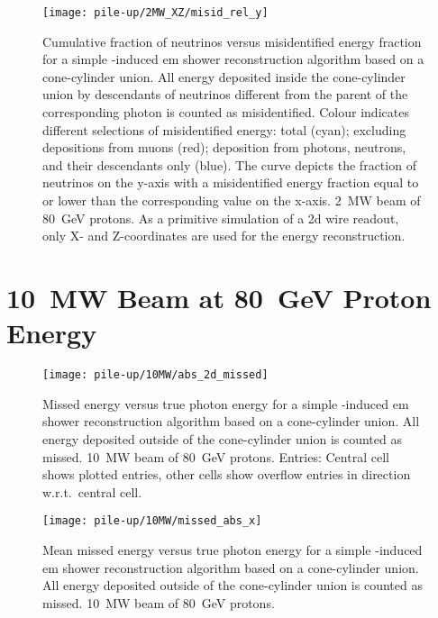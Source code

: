 \begin{figure}[tbp]
	\centering
	\texttt{[image: pile-up/2MW\_XZ/misid\_rel\_y]}
	\caption[Pile-up study neutrino vs.\ misidentified energy fraction, \SI{2}{\mega\watt} beam, XZ projection]{%
		Cumulative fraction of neutrinos versus misidentified energy fraction for a simple \Pgpz-induced \acrshort{em} shower reconstruction algorithm based on a cone-cylinder union.
		All energy deposited inside the cone-cylinder union by descendants of neutrinos different from the parent of the corresponding \Pgpz photon is counted as misidentified.
		Colour indicates different selections of misidentified energy: total (cyan); excluding depositions from muons (red); deposition from photons, neutrons, and their descendants only (blue).
		The curve depicts the fraction of neutrinos on the y-axis with a misidentified energy fraction equal to or lower than the corresponding value on the x-axis.
		\SI{2}{\mega\watt} beam of \SI{80}{\giga\electronvolt} protons.
		As a primitive simulation of a \acrshort{2d} wire readout, only X- and Z-coordinates are used for the energy reconstruction.
	}
\end{figure}


\clearpage
\section{\SI{10}{\mega\watt} Beam at \SI{80}{\giga\electronvolt} Proton Energy}

\begin{figure}[htbp]
	\centering
	\texttt{[image: pile-up/10MW/abs\_2d\_missed]}
	\caption[Pile-up study missed vs.\ true photon energy, \SI{10}{\mega\watt} beam]{%
		Missed energy versus true photon energy for a simple \Pgpz-induced \acrshort{em} shower reconstruction algorithm based on a cone-cylinder union.
		All energy deposited outside of the cone-cylinder union is counted as missed.
		\SI{10}{\mega\watt} beam of \SI{80}{\giga\electronvolt} protons.
		Entries: Central cell shows plotted entries, other cells show overflow entries in direction w.r.t.\ central cell.
	}
\end{figure}

\begin{figure}[tbp]
	\centering
	\texttt{[image: pile-up/10MW/missed\_abs\_x]}
	\caption[Pile-up study mean missed vs.\ true photon energy, \SI{10}{\mega\watt} beam]{%
		Mean missed energy versus true photon energy for a simple \Pgpz-induced \acrshort{em} shower reconstruction algorithm based on a cone-cylinder union.
		All energy deposited outside of the cone-cylinder union is counted as missed.
		\SI{10}{\mega\watt} beam of \SI{80}{\giga\electronvolt} protons.
	}
\end{figure}

